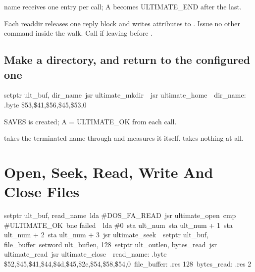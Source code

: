 \begin{resultbox}
name receives one entry per call; A becomes ULTIMATE_END after the last.
\end{resultbox}

Each readdir releases one reply block and writes attributes to
. Issue no other command inside the walk. Call
 if leaving before .

\subsection*{Make a directory, and return to the configured one}

\begin{listingbox}
\hspace*{2em}setptr ult\_buf, dir\_name\
\hspace*{2em}jsr ultimate\_mkdir\
\
\hspace*{2em}jsr ultimate\_home\
\
dir\_name: .byte \$53,\$41,\$56,\$45,\$53,0
\end{listingbox}

\begin{resultbox}
SAVES is created; A = ULTIMATE_OK from each call.
\end{resultbox}

 takes the terminated name through  and
measures it itself.  takes nothing at all.


\section{Open, Seek, Read, Write And Close Files}

\begin{listingbox}
\hspace*{2em}setptr ult\_buf, read\_name\
\hspace*{2em}lda \#DOS\_FA\_READ\
\hspace*{2em}jsr ultimate\_open\
\hspace*{2em}cmp \#ULTIMATE\_OK\
\hspace*{2em}bne failed\
\
\hspace*{2em}lda \#0\
\hspace*{2em}sta ult\_num\
\hspace*{2em}sta ult\_num + 1\
\hspace*{2em}sta ult\_num + 2\
\hspace*{2em}sta ult\_num + 3\
\hspace*{2em}jsr ultimate\_seek\
\
\hspace*{2em}setptr ult\_buf, file\_buffer\
\hspace*{2em}setword ult\_buflen, 128\
\hspace*{2em}setptr ult\_outlen, bytes\_read\
\hspace*{2em}jsr ultimate\_read\
\hspace*{2em}jsr ultimate\_close\
\
read\_name:   .byte \$52,\$45,\$41,\$44,\$4d,\$45,\$2e,\$54,\$58,\$54,0\
file\_buffer: .res 128\
bytes\_read:  .res 2
\end{listingbox}

